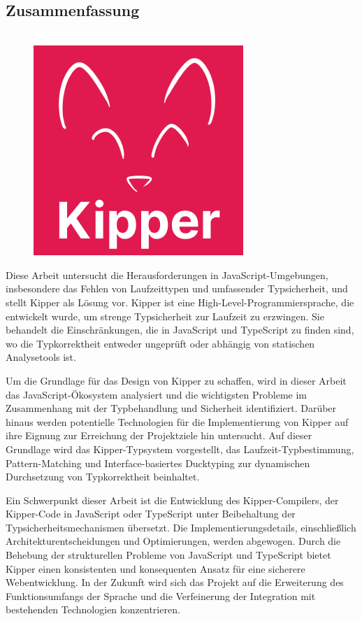 \begin{spacing}{1}
	\chapter*{Zusammenfassung}
\end{spacing}
\begin{figure}
	\begin{center}
		\includegraphics[height=0.4\textwidth]{pics/Kipper-Logo.png}
	\end{center}
\end{figure}

Diese Arbeit untersucht die Herausforderungen in JavaScript-Umgebungen, insbesondere das Fehlen von Laufzeittypen und umfassender Typsicherheit, und stellt Kipper als Lösung vor. Kipper ist eine High-Level-Programmiersprache, die entwickelt wurde, um strenge Typsicherheit zur Laufzeit zu erzwingen. Sie behandelt die Einschränkungen, die in JavaScript und TypeScript zu finden sind, wo die Typkorrektheit entweder ungeprüft oder abhängig von statischen Analysetools ist.

Um die Grundlage für das Design von Kipper zu schaffen, wird in dieser Arbeit das JavaScript-Ökosystem analysiert und die wichtigsten Probleme im Zusammenhang mit der Typbehandlung und Sicherheit identifiziert. Darüber hinaus werden potentielle Technologien für die Implementierung von Kipper auf ihre Eignung zur Erreichung der Projektziele hin untersucht. Auf dieser Grundlage wird das Kipper-Typsystem vorgestellt, das Laufzeit-Typbestimmung, Pattern-Matching und Interface-basiertes Ducktyping zur dynamischen Durchsetzung von Typkorrektheit beinhaltet.

Ein Schwerpunkt dieser Arbeit ist die Entwicklung des Kipper-Compilers, der Kipper-Code in JavaScript oder TypeScript unter Beibehaltung der Typsicherheitsmechanismen übersetzt. Die Implementierungsdetails, einschließlich Architekturentscheidungen und Optimierungen, werden abgewogen. Durch die Behebung der strukturellen Probleme von JavaScript und TypeScript bietet Kipper einen konsistenten und konsequenten Ansatz für eine sicherere Webentwicklung. In der Zukunft wird sich das Projekt auf die Erweiterung des Funktionsumfangs der Sprache und die Verfeinerung der Integration mit bestehenden Technologien konzentrieren.


